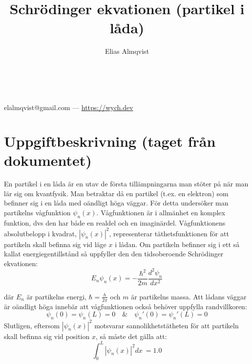 \documentclass{article}
\makeatletter
\renewcommand{\maketitle}{
	\begin{center}
		{\huge\bfseries\thetitle}\\
		\vspace{1em}
		{\Large\theauthor} \\
		\vspace{1em}
		elalmqvist@gmail.com --- \url{https://wych.dev}
	\end{center}
}
\newcommand{\wavefun}{\psi_n(x)}
\newcommand{\shrodequ}{E_n \psi_n(x) = - \frac{\hbar^2}{2m} \frac{d^2 \psi_n}{dx^2}}
\newcommand{\shrodprob}{|\psi_n(x)|^2}
\makeatother
\begin{document}
\title{Schrödinger ekvationen (partikel i låda)}
\author{Elias Almqvist}

\maketitle
\newpage

\section{Uppgiftbeskrivning (taget från dokumentet)}
En partikel i en låda är en utav de första tillämpningarna man stöter på när man lär sig om kvantfysik. Man betraktar då en partikel (t.ex. en elektron) som befinner sig i en låda med oändligt höga väggar.
För detta undersöker man partikelns vågfunktion $\wavefun$. Vågfunktionen är i allmänhet en komplex funktion,
dvs den har både en realdel och en imaginärdel. Vågfunktionens absolutbelopp i kvadrat, $\shrodprob$, representerar täthetsfunktionen för att partikeln skall befinna sig vid läge $x$ i lådan. Om partikeln befinner sig i ett så
kallat energiegentillstånd så uppfyller den den tidsoberoende Schrödinger ekvationen:
\begin{equation} \label{shrodequ}
	\shrodequ
\end{equation}

där $E_n$ är partikelns energi, $\hbar = \frac{h}{2\pi}$ och $m$ är partikelns massa.
Att lådans väggar är oändligt höga innebär att vågfunktionen också behöver uppfylla randvillkoren:
\begin{equation} \label{shrodequ_con1}
	\psi_n(0) = \psi_n(L) = 0 \quad \& \quad \psi_n'(0) = \psi_n'(L) = 0 
\end{equation}
Slutligen, eftersom $\shrodprob$ motsvarar sannolikhetstätheten för att partikeln skall befinna sig vid position $x$, så måste det gälla att:
\begin{equation} \label{shrodequ_con2}
	\int_0^L \shrodprob dx\ = 1.0
\end{equation}
\end{document}

